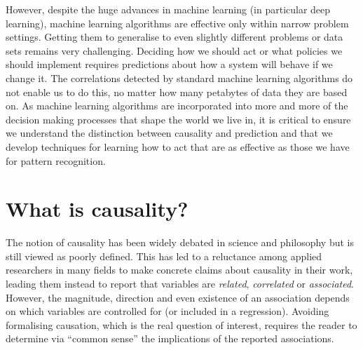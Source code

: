 \documentclass[11pt,a4paper,twoside]{report}
\newcommand{\quotes}[1]{``#1''}
\theoremstyle{plain}
\theoremstyle{definition}
\begin{document}
However, despite the huge advances in machine learning (in particular deep learning), machine learning algorithms are effective only within narrow problem settings. Getting them to generalise to even slightly different problems or data sets remains very challenging. Deciding how we should act or what policies we should implement requires predictions about how a system will behave if we change it. The correlations detected by standard machine learning algorithms do not enable us to do this, no matter how many petabytes of data they are based on. As machine learning algorithms are incorporated into more and more of the decision making processes that shape the world we live in, it is critical to ensure we understand the distinction between causality and prediction and that we develop techniques for learning how to act that are as effective as those we have for pattern recognition.


\section{What is causality? }

The notion of causality has been widely debated in science and philosophy \citep{hume1741treatise,mill1893system,pearson1911grammar,Pearl2000,Lewis2000,woodward2005making,heckman20051,cartwright2007hunting} but is still viewed as poorly defined. This has led to a reluctance among applied researchers in many fields to make concrete claims about causality in their work, leading them instead to report that variables are \textit{related}, \textit{correlated} or \textit{associated}. However, the magnitude, direction and even existence of an association depends on which variables are controlled for (or included in a regression). Avoiding formalising causation, which is the real question of interest, requires the reader to determine via \quotes{common sense} the implications of the reported associations.
\end{document}
